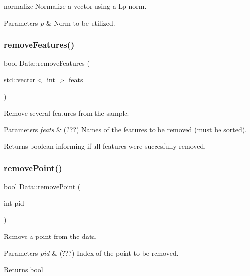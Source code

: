 normalize Normalize a vector using a Lp-\/norm. 


\begin{DoxyParams}{Parameters}
{\em p} & Norm to be utilized. \\
\hline
\end{DoxyParams}
\mbox{\label{class_data_a0e0136f31687452ff10b489f8804ceb8}} 
\subsubsection{\texorpdfstring{remove\+Features()}{removeFeatures()}}
{\footnotesize\ttfamily bool Data\+::remove\+Features (\begin{DoxyParamCaption}\item[{std\+::vector$<$ int $>$}]{feats }\end{DoxyParamCaption})}



Remove several features from the sample. 


\begin{DoxyParams}{Parameters}
{\em feats} & (???) Names of the features to be removed (must be sorted). \\
\hline
\end{DoxyParams}
\begin{DoxyReturn}{Returns}
boolean informing if all features were succesfully removed. 
\end{DoxyReturn}
\mbox{\label{class_data_ad927494a13a5018ff3644212d7234a03}} 
\subsubsection{\texorpdfstring{remove\+Point()}{removePoint()}}
{\footnotesize\ttfamily bool Data\+::remove\+Point (\begin{DoxyParamCaption}\item[{int}]{pid }\end{DoxyParamCaption})}



Remove a point from the data. 


\begin{DoxyParams}{Parameters}
{\em pid} & (???) Index of the point to be removed. \\
\hline
\end{DoxyParams}
\begin{DoxyReturn}{Returns}
bool 
\end{DoxyReturn}
\mbox{\label{class_data_a6cc376e614e5440061c66833e1c8d30a}} 
